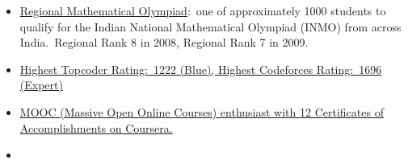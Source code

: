 \documentclass[10pt,a4paper]{article}
\begin{document}
\vspace{0.15cm}
\begin{itemize}[labelindent=1.5em,labelsep=-0.3cm,leftmargin=*]

\item \headedsubsection 
{{\normalfont \href{http://www.isical.ac.in/~rmo/}{Regional Mathematical Olympiad}:~one of approximately 1000 students to qualify for the Indian National Mathematical Olympiad (INMO) from across India.~Regional Rank 8 in 2008, Regional Rank 7 in 2009.
}}{{{}}}

\item \headedsubsection 
{\href{}{\normalfont Highest Topcoder Rating:~\href{https://www.topcoder.com/members/f1zz0_13/details/?track=DATA_SCIENCE&subTrack=SRM&tab=statistics}{1222} (Blue), Highest Codeforces Rating:~\href{http://codeforces.com/profile/thatDarkHorse}{1696} (Expert) 
	}}{{{}}}{{}}
	
\item \headedsubsection 
{\href{}{\normalfont MOOC (Massive Open Online Courses) enthusiast with 12 Certificates of Accomplishments on Coursera.
}}{{{}}}
{}

\item {}


\end{itemize}
\end{document}
